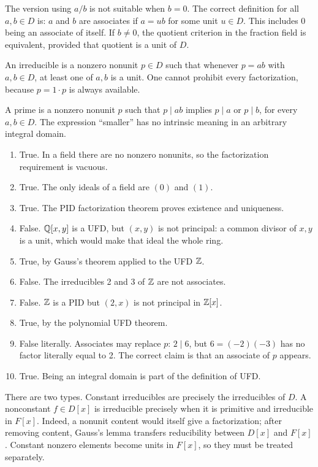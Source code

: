 The version using $a/b$ is not suitable when $b=0$. The correct definition for all $a,b\in D$ is: $a$ and $b$ are associates if $a=ub$ for some unit $u\in D$. This includes $0$ being an associate of itself. If $b\ne0$, the quotient criterion in the fraction field is equivalent, provided that quotient is a unit of $D$.

An irreducible is a nonzero nonunit $p\in D$ such that whenever $p=ab$ with $a,b\in D$, at least one of $a,b$ is a unit. One cannot prohibit every factorization, because $p=1\cdot p$ is always available.

A prime is a nonzero nonunit $p$ such that $p\mid ab$ implies $p\mid a$ or $p\mid b$, for every $a,b\in D$. The expression ``smaller'' has no intrinsic meaning in an arbitrary integral domain.

\begin{enumerate}[label=(\alph*)]
\item True. In a field there are no nonzero nonunits, so the factorization requirement is vacuous.
\item True. The only ideals of a field are $(0)$ and $(1)$.
\item True. The PID factorization theorem proves existence and uniqueness.
\item False. $\mathbb{Q}[x,y]$ is a UFD, but $(x,y)$ is not principal: a common divisor of $x,y$ is a unit, which would make that ideal the whole ring.
\item True, by Gauss's theorem applied to the UFD $\mathbb{Z}$.
\item False. The irreducibles 2 and 3 of $\mathbb{Z}$ are not associates.
\item False. $\mathbb{Z}$ is a PID but $(2,x)$ is not principal in $\mathbb{Z}[x]$.
\item True, by the polynomial UFD theorem.
\item False literally. Associates may replace $p$: $2\mid6$, but $6=(-2)(-3)$ has no factor literally equal to 2. The correct claim is that an associate of $p$ appears.
\item True. Being an integral domain is part of the definition of UFD.
\end{enumerate}

There are two types. Constant irreducibles are precisely the irreducibles of $D$. A nonconstant $f\in D[x]$ is irreducible precisely when it is primitive and irreducible in $F[x]$. Indeed, a nonunit content would itself give a factorization; after removing content, Gauss's lemma transfers reducibility between $D[x]$ and $F[x]$. Constant nonzero elements become units in $F[x]$, so they must be treated separately.

